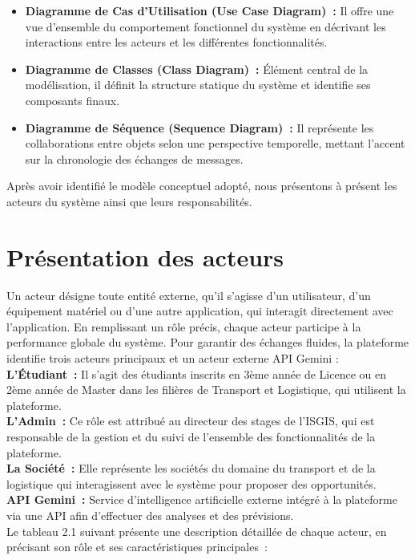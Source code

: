 \begin{itemize}
  \item \textbf{Diagramme de Cas d'Utilisation (Use Case Diagram)~:} Il offre une vue d'ensemble du comportement fonctionnel du système en décrivant les interactions entre les acteurs et les différentes fonctionnalités.
  \item \textbf{Diagramme de Classes (Class Diagram)~:} Élément central de la modélisation, il définit la structure statique du système et identifie ses composants finaux.
  \item \textbf{Diagramme de Séquence (Sequence Diagram)~:} Il représente les collaborations entre objets selon une perspective temporelle, mettant l'accent sur la chronologie des échanges de messages.
\end{itemize}
Après avoir identifié le modèle conceptuel adopté, nous présentons à présent les acteurs du système ainsi que leurs responsabilités.

\section{Présentation des acteurs}

Un acteur désigne toute entité externe, qu’il s’agisse d’un utilisateur, d’un équipement matériel ou d’une autre application, qui interagit directement avec l’application. En remplissant un rôle précis, chaque acteur participe à la performance globale du système. Pour garantir des échanges fluides, la plateforme identifie trois acteurs principaux et un acteur externe API Gemini :\quad
\\\textbf{L'Étudiant~:} Il s'agit des étudiants inscrits en 3ème année de Licence ou en 2ème année de Master dans les filières de Transport et Logistique, qui utilisent la plateforme.
\\ \textbf{L'Admin~:} Ce rôle est attribué au directeur des stages de l'ISGIS, qui est responsable de la gestion et du suivi de l’ensemble des fonctionnalités de la plateforme.
\\\textbf{La Société~:} Elle représente les sociétés du domaine du transport et de la logistique qui interagissent avec le système pour proposer des opportunités.
\\\textbf{API Gemini~:} Service d'intelligence artificielle externe intégré à la plateforme via une API afin d'effectuer des analyses et des prévisions.\quad
\\Le tableau 2.1 suivant présente une description détaillée de chaque acteur, en précisant son rôle et ses caractéristiques principales~:

